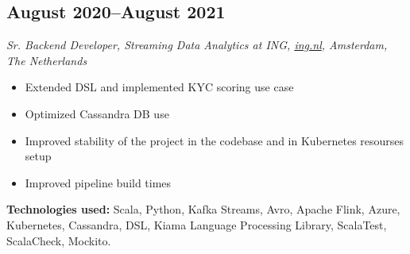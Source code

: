\subsection*{August 2020--August 2021}

\textit{Sr. Backend Developer, Streaming Data Analytics at ING, \href{https://ing.nl}{\url{ing.nl}}, Amsterdam, The Netherlands}

\begin{itemize}[noitemsep]
  \item Extended DSL and implemented KYC scoring use case
  \item Optimized Cassandra DB use
  \item Improved stability of the project in the codebase and in Kubernetes resourses setup
  \item Improved pipeline build times
\end{itemize}

\textbf{Technologies used:}
Scala, Python, Kafka Streams, Avro, Apache Flink, Azure, Kubernetes, Cassandra,
 DSL, Kiama Language Processing Library, ScalaTest, ScalaCheck, Mockito.
